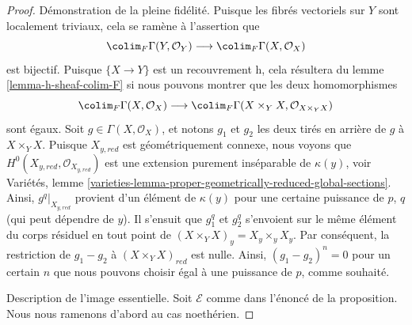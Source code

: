 \begin{proof}
Démonstration de la pleine fidélité. Puisque les fibrés vectoriels sur $Y$ sont localement
triviaux, cela se ramène à l'assertion que
$$
\colim_F \Gamma(Y, \mathcal{O}_Y)
\longrightarrow
\colim_F \Gamma(X, \mathcal{O}_X)
$$
est bijectif. Puisque $\{X \to Y\}$ est un recouvrement h, cela
résultera du lemme \ref{lemma-h-sheaf-colim-F} si nous pouvons montrer que les deux homomorphismes
$$
\colim_F \Gamma(X, \mathcal{O}_X)
\longrightarrow
\colim_F \Gamma(X \times_Y X, \mathcal{O}_{X \times_Y X})
$$
sont égaux. Soit $g \in \Gamma(X, \mathcal{O}_X)$,
et notons $g_1$ et $g_2$ les deux tirés en arrière de $g$ à $X \times_Y X$.
Puisque $X_{y, red}$ est géométriquement connexe, nous
voyons que $H^0(X_{y, red}, \mathcal{O}_{X_{y, red}})$ est
une extension purement inséparable de $\kappa(y)$, voir
Variétés, lemme
\ref{varieties-lemma-proper-geometrically-reduced-global-sections}.
Ainsi, $g^q|_{X_{y, red}}$ provient d'un élément de
$\kappa(y)$ pour une certaine puissance de $p$, $q$ (qui peut dépendre de $y$).
Il s'ensuit que $g_1^q$ et $g_2^q$ s'envoient sur le même
élément du corps résiduel en tout point de
$(X \times_Y X)_y = X_y \times_y X_y$.
Par conséquent, la restriction de $g_1 - g_2$ à $(X \times_Y X)_{red}$ est nulle.
Ainsi, $(g_1 - g_2)^n = 0$ pour un certain $n$ que nous pouvons choisir
égal à une puissance de $p$, comme souhaité.

\medskip\noindent
Description de l'image essentielle. Soit $\mathcal{E}$ comme dans l'énoncé
de la proposition. Nous nous ramenons d'abord au cas noethérien.


\end{proof}
